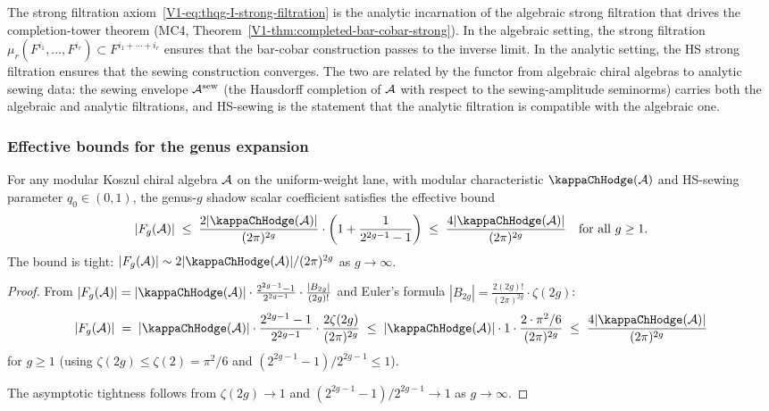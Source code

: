 \begin{remark}[Connection to MC4]
The strong filtration axiom~\eqref{V1-eq:thqg-I-strong-filtration} is the analytic incarnation of the algebraic strong filtration that drives the completion-tower theorem (MC4, Theorem~\ref{V1-thm:completed-bar-cobar-strong}). In the algebraic setting, the strong filtration $\mu_r(F^{i_1}, \ldots, F^{i_r}) \subset F^{i_1 + \cdots + i_r}$ ensures that the bar-cobar construction passes to the inverse limit. In the analytic setting, the HS strong filtration ensures that the sewing construction converges. The two are related by the functor from algebraic chiral algebras to analytic sewing data: the sewing envelope $\mathcal{A}^{\mathrm{sew}}$ (the Hausdorff completion of $\mathcal{A}$ with respect to the sewing-amplitude seminorms) carries both the algebraic and analytic filtrations, and HS-sewing is the statement that the analytic filtration is compatible with the algebraic one.
\end{remark}

\subsubsection{Effective bounds for the genus expansion}

\begin{proposition}
For any modular Koszul chiral algebra $\mathcal{A}$ on the uniform-weight lane, with modular characteristic $\kappaChHodge(\cA)$ and
HS-sewing parameter $q_0 \in (0,1)$, the genus-$g$ shadow scalar
coefficient satisfies the effective bound
\begin{equation}%
|F_g(\cA)| \;\leq\; \frac{2|\kappaChHodge(\cA)|}{(2\pi)^{2g}} \cdot \left(1 + \frac{1}{2^{2g-1} - 1}\right) \;\leq\; \frac{4|\kappaChHodge(\cA)|}{(2\pi)^{2g}} \quad\text{for all } g \geq 1.
\end{equation}
The bound is tight: $|F_g(\cA)| \sim 2|\kappaChHodge(\cA)|/(2\pi)^{2g}$ as $g \to \infty$.
\end{proposition}

\begin{proof}
From $|F_g(\cA)| = |\kappaChHodge(\cA)| \cdot \frac{2^{2g-1}-1}{2^{2g-1}} \cdot \frac{|B_{2g}|}{(2g)!}$ and Euler's formula $|B_{2g}| = \frac{2(2g)!}{(2\pi)^{2g}} \cdot \zeta(2g)$:
\[
|F_g(\cA)| \;=\; |\kappaChHodge(\cA)| \cdot \frac{2^{2g-1}-1}{2^{2g-1}} \cdot \frac{2\zeta(2g)}{(2\pi)^{2g}} \;\leq\; |\kappaChHodge(\cA)| \cdot 1 \cdot \frac{2 \cdot \pi^2/6}{(2\pi)^{2g}} \;\leq\; \frac{4|\kappaChHodge(\cA)|}{(2\pi)^{2g}}
\]
for $g \geq 1$ (using $\zeta(2g) \leq \zeta(2) = \pi^2/6$ and $(2^{2g-1}-1)/2^{2g-1} \leq 1$).

The asymptotic tightness follows from $\zeta(2g) \to 1$ and $(2^{2g-1}-1)/2^{2g-1} \to 1$ as $g \to \infty$.
\end{proof}

